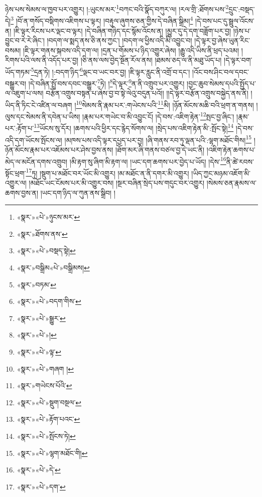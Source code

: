 ཉེས་པས་སེམས་ལ་ཁྱབ་པར་འགྱུར། །:ཡུངས་མར་\footnote{«སྣར་»«པེ་»ཉུངས་མར་}བཀང་བའི་སྣོད་བཀུར་ལ། །རལ་གྲི་:ཐོགས་པས་\footnote{«སྣར་»ཐོགས་ནས་}དྲུང་:བསྡད་དེ།\footnote{«སྣར་»«པེ་»བསྡད་སྟེ།} །བོ་ན་གསོད་བསྡིགས་འཇིགས་པ་ལྟར། །བརྟུལ་ཞུགས་ཅན་གྱིས་དེ་བཞིན་སྒྲིམ།\footnote{«སྣར་»བསྒྲིམ«པེ་»བསྒྲིམས།} །དེ་བས་པང་དུ་སྦྲུལ་འོངས་ན། །ཇི་ལྟར་རིངས་པར་ལྡང་བ་ལྟར། །དེ་བཞིན་གཉིད་དང་སྙོམ་འོངས་ན། །མྱུར་དུ་དེ་དག་བཟློག་པར་བྱ། །ཉེས་པ་བྱུང་བ་རེ་རེ་ཞིང་། །བདག་ལ་སྨད་ནས་ཅི་ནས་ཀྱང་། །བདག་ལ་ཕྱིས་འདི་མི་འབྱུང་བ། །དེ་ལྟར་བྱ་ཞེས་ཡུན་རིང་བསམ། །ཇི་ལྟར་གནས་སྐབས་འདི་དག་ལ། །དྲན་པ་གོམས་པ་ཉིད་འགྱུར་ཞེས། །རྒྱུ་འདི་ཡིས་ནི་ཕྲད་པའམ། །རིགས་པའི་ལས་ནི་འདོད་པར་བྱ། །ཅི་ནས་ལས་བྱེད་སྔོན་རོལ་ནས། །ཐམས་ཅད་ལ་ནི་མཐུ་ཡོད་པ། །དེ་ལྟར་བག་ཡོད་གཏམ་\footnote{«སྣར་»བཏམ་}དྲན་ཏེ། །:བདག་ཉིད་\footnote{«སྣར་»«པེ་»བདག་གིས་}ལྡང་བ་ཡང་བར་བྱ། །ཇི་ལྟར་རླུང་ནི་འགྲོ་བ་དང་། །འོང་བས་ཤིང་བལ་དབང་བསྒྱུར་བ། །དེ་བཞིན་སྤྲོ་བས་དབང་བསྒྱུར་\footnote{«སྣར་»«པེ་»སྒྱུར་}ཏེ། །\footnote{«སྣར་»«པེ་»། }དེ་ལྟར་\footnote{«སྣར་»«པེ་»ལྟ་}ན་ནི་འགྲུབ་པར་འགྱུར། །བྱང་ཆུབ་སེམས་དཔའི་སྤྱོད་པ་ལ་འཇུག་པ་ལས། བརྩོན་འགྲུས་བསྟན་པ་ཞེས་བྱ་བ་སྟེ་ལེའུ་བདུན་པའོ།། །།དེ་ལྟར་བརྩོན་འགྲུས་བསྐྱེད་ནས་ནི། །ཡིད་ནི་ཏིང་ངེ་འཛིན་ལ་བཞག །\footnote{«སྣར་»«པེ་»གཞག །}སེམས་ནི་རྣམ་པར་:གཡེངས་པའི་\footnote{«སྣར་»གཡེངས་པོའི་}མི། །ཉོན་མོངས་མཆི་བའི་ཕྲག་ན་གནས། །ལུས་དང་སེམས་ནི་དབེན་པ་ཡིས། །རྣམ་པར་གཡེང་བ་མི་འབྱུང་ངོ། །དེ་བས་:འཇིག་རྟེན་\footnote{«སྣར་»«པེ་»སྡུག་བསྔལ་}སྤང་བྱ་ཞིང་། །རྣམ་པར་:རྟོག་པ་\footnote{«སྣར་»«པེ་»རྟོག་པའང་}ཡོངས་སུ་དོར། །ཆགས་པའི་ཕྱིར་དང་རྙེད་སོགས་ལ། །སྲེད་པས་འཇིག་རྟེན་མི་:སྤོང་སྟེ།\footnote{«སྣར་»«པེ་»སྤོངས་ཏེ།} །དེ་བས་འདི་དག་ཡོངས་སྤོངས་ལ། །མཁས་པས་འདི་ལྟར་དཔྱད་པར་བྱ། །ཞི་གནས་རབ་ཏུ་ལྡན་པའི་:ལྷག་མཐོང་གིས།\footnote{«སྣར་»«པེ་»ལྷག་མཐོང་གི།} །ཉོན་མོངས་རྣམ་པར་འཇོམས་པར་ཤེས་བྱས་ནས། །ཐོག་མར་ཞི་གནས་བཙལ་བྱ་དེ་ཡང་ནི། །འཇིག་རྟེན་ཆགས་པ་མེད་ལ་མངོན་དགས་འགྲུབ། །མི་རྟག་སུ་ཞིག་མི་རྟག་ལ། །ཡང་དག་ཆགས་པར་བྱེད་པ་ཡོད། །དེས་\footnote{«སྣར་»«པེ་»དེ་}ནི་ཚེ་རབས་སྟོང་ཕྲག་\footnote{«སྣར་»«པེ་»དག་}ཏུ། །སྡུག་པ་མཐོང་བར་ཡོང་མི་འགྱུར། །མ་མཐོང་ན་ནི་དགར་མི་འགྱུར། །ཡིད་ཀྱང་མཉམ་འཇོག་མི་འགྱུར་ལ། །མཐོང་ཡང་ངོམས་པར་མི་འགྱུར་བས། །སྔར་བཞིན་སྲེད་པས་གདུང་བར་འགྱུར། །སེམས་ཅན་རྣམས་ལ་ཆགས་བྱས་ན། །ཡང་དག་ཉིད་ལ་ཀུན་ནས་སྒྲིབ། །
